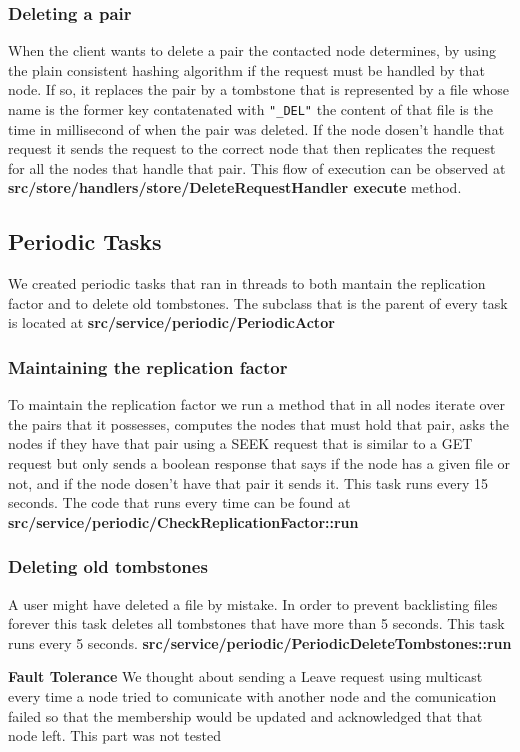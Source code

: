 \subsubsection{Deleting a pair}
When the client wants to delete a pair the contacted node determines, by using the plain consistent hashing algorithm if the request must be handled by that node. If so, it replaces the pair by a tombstone that is represented by a file whose name is the former key contatenated with \texttt{"\_DEL"} the content of that file is the time in millisecond of when the pair was deleted. If the node dosen't handle that request it sends the request to the correct node that then replicates the request for all the nodes that handle that pair. This flow of execution can be observed at \textbf{src/store/handlers/store/DeleteRequestHandler execute} method.

\subsection{Periodic Tasks}
We created periodic tasks that ran in threads to both mantain the replication factor and to delete old tombstones. The subclass that is the parent of every task is located at \textbf{src/service/periodic/PeriodicActor}
\subsubsection{Maintaining the replication factor}
To maintain the replication factor we run a method that in all nodes iterate over the pairs that it possesses, computes the nodes that must hold that pair, asks the nodes if they have that pair using a SEEK request that is similar to a GET request but only sends a boolean response that says if the node has a given file or not, and if the node dosen't have that pair it sends it. This task runs every 15 seconds. The code that runs every time can be found at \textbf{src/service/periodic/CheckReplicationFactor::run}

\subsubsection{Deleting old tombstones}
A user might have deleted a file by mistake. In order to prevent backlisting files forever this task deletes all tombstones that have more than 5 seconds. This task runs every 5 seconds. \textbf{src/service/periodic/PeriodicDeleteTombstones::run}

\textbf{Fault Tolerance}
We thought about sending a Leave request using multicast every time a node tried to comunicate with another node and the comunication failed so that the membership would be updated and acknowledged that that node left. This part was not tested